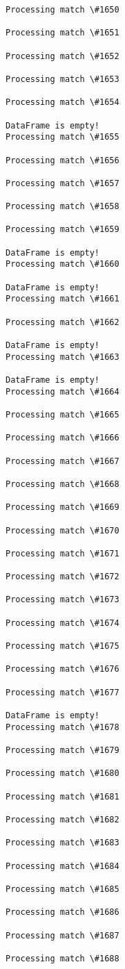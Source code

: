 \documentclass[11pt]{article}
\begin{document}
\begin{Verbatim}[commandchars=\\\{\}]
Processing match \#1650

Processing match \#1651

Processing match \#1652

Processing match \#1653

Processing match \#1654

DataFrame is empty!
Processing match \#1655

Processing match \#1656

Processing match \#1657

Processing match \#1658

Processing match \#1659

DataFrame is empty!
Processing match \#1660

DataFrame is empty!
Processing match \#1661

Processing match \#1662

DataFrame is empty!
Processing match \#1663

DataFrame is empty!
Processing match \#1664

Processing match \#1665

Processing match \#1666

Processing match \#1667

Processing match \#1668

Processing match \#1669

Processing match \#1670

Processing match \#1671

Processing match \#1672

Processing match \#1673

Processing match \#1674

Processing match \#1675

Processing match \#1676

Processing match \#1677

DataFrame is empty!
Processing match \#1678

Processing match \#1679

Processing match \#1680

Processing match \#1681

Processing match \#1682

Processing match \#1683

Processing match \#1684

Processing match \#1685

Processing match \#1686

Processing match \#1687

Processing match \#1688


\end{Verbatim}
\end{document}
